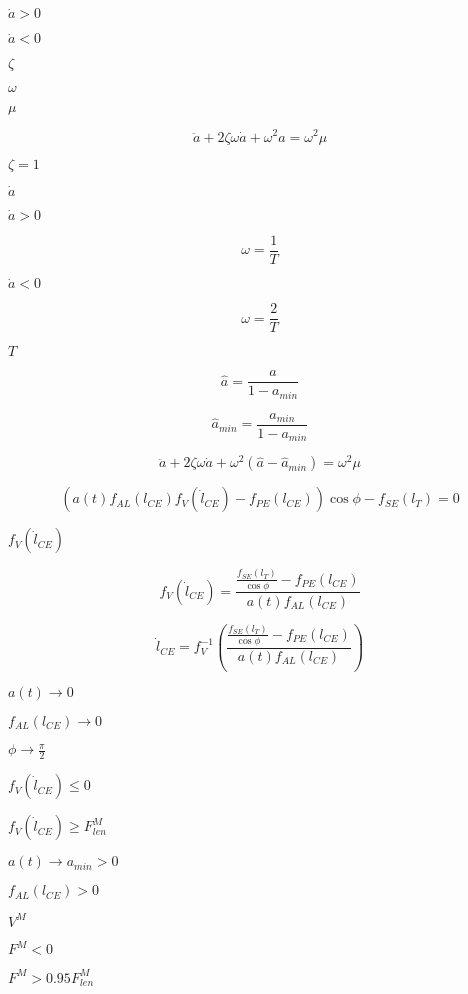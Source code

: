 \documentclass{article}
\begin{document}
$\dot{a} > 0$
\pagebreak

$\dot{a} < 0$
\pagebreak

$\zeta$
\pagebreak

$\omega$
\pagebreak

$\mu$
\pagebreak

\[ \ddot{a} + 2 \zeta \omega \dot{a} + \omega^2 a = \omega^2\mu \]
\pagebreak

$\zeta = 1$
\pagebreak

$\dot{a}$
\pagebreak

$\dot{a}>0$
\pagebreak

\[ \omega = \frac{1}{T} \]
\pagebreak

$\dot{a}<0$
\pagebreak

\[ \omega = \frac{2}{T} \]
\pagebreak

$ T $
\pagebreak

\[ \hat{a} = \frac{a}{1-a_{min}} \]
\pagebreak

\[ \hat{a}_{min} = \frac{a_{min}}{1-a_{min}} \]
\pagebreak

\[ \ddot{a}+2\zeta\omega\dot{a}+\omega^2(\hat{a}-\hat{a}_{min})=\omega^2\mu \]
\pagebreak

\[ (a(t) f_{AL}(l_{CE}) f_{V}(\dot{l}_{CE}) - f_{PE}(l_{CE}))\cos \phi - f_{SE}(l_{T}) = 0 \]
\pagebreak

$ f_{V}(\dot{l}_{CE}) $
\pagebreak

\[ f_{V}(\dot{l}_{CE}) = \frac{ \frac{f_{SE}(l_{T})}{\cos\phi} - f_{PE}(l_{CE}) }{ a(t) f_{AL}(l_{CE}) } \]
\pagebreak

\[ \dot{l}_{CE} = f_{V}^{-1}( \frac{ \frac{f_{SE}(l_{T})}{\cos\phi} - f_{PE}(l_{CE}) }{ a(t) f_{AL}(l_{CE}) } ) \]
\pagebreak

$ a(t) \rightarrow 0 $
\pagebreak

$ f_{AL}(l_{CE}) \rightarrow 0 $
\pagebreak

$ \phi \rightarrow \frac{\pi}{2} $
\pagebreak

$ f_{V}(\dot{l}_{CE}) \le 0 $
\pagebreak

$ f_{V}(\dot{l}_{CE}) \ge F^M_{len}$
\pagebreak

$ a(t) \rightarrow a_{min} > 0 $
\pagebreak

$ f_{AL}(l_{CE}) > 0 $
\pagebreak

$ V^M $
\pagebreak

$ F^M < 0$
\pagebreak

$ F^M > 0.95 F^M_{len}$
\pagebreak
\end{document}
